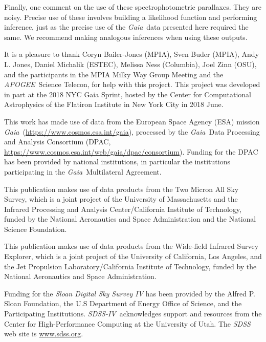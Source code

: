 \documentclass[modern]{aastex62}
\newcommand{\acronym}[1]{{\small{#1}}}
\newcommand{\project}[1]{\textsl{#1}}
\newcommand{\apogee}{\project{\acronym{APOGEE}}}
\newcommand{\gaia}{\project{Gaia}}
\newcommand{\sdssiv}{\project{\acronym{SDSS-IV}}}
\begin{document}
Finally, one comment on the use of these spectrophotometric parallaxes.
They are noisy.
Precise use of these involves building a likelihood function and performing inference,
just as the precise use of the \gaia\ data presented here required the same.
We recommend making analogous inferences when using these outputs.

\acknowledgements
It is a pleasure to thank
  Coryn Bailer-Jones (\acronym{MPIA}),
  Sven Buder (\acronym{MPIA}),
  Andy L. Jones,
  Daniel Michalik (\acronym{ESTEC}),
  Melissa Ness (Columbia),
  Joel Zinn (OSU),
  and the participants in the \acronym{MPIA} Milky Way Group Meeting
  and the \apogee\ Science Telecon,
for help with this project.
This project was developed in part at the
2018 \acronym{NYC} Gaia Sprint, hosted by the Center for Computational Astrophysics of
the Flatiron Institute in New York City in 2018 June.

This work has made use of data from the European Space Agency (\acronym{ESA}) mission
\gaia\ (\url{https://www.cosmos.esa.int/gaia}), processed by the \gaia\ Data
Processing and Analysis Consortium (\acronym{DPAC},
\url{https://www.cosmos.esa.int/web/gaia/dpac/consortium}). Funding for the
\acronym{DPAC}
has been provided by national institutions, in particular the institutions
participating in the \gaia\ Multilateral Agreement.

This publication makes use of data products from the Two Micron All Sky Survey, which is a joint project of the University of Massachusetts and the Infrared Processing and Analysis Center/California Institute of Technology, funded by the National Aeronautics and Space Administration and the National Science Foundation.

This publication makes use of data products from the Wide-field Infrared Survey Explorer, which is a joint project of the University of California, Los Angeles, and the Jet Propulsion Laboratory/California Institute of Technology, funded by the National Aeronautics and Space Administration.

Funding for the \project{Sloan Digital Sky Survey IV} has been provided by the Alfred P. Sloan Foundation, the U.S Department of Energy Office of Science, and the Participating Institutions. \sdssiv\ acknowledges
support and resources from the Center for High-Performance Computing at
the University of Utah. The \project{\acronym{SDSS}} web site is \url{www.sdss.org}.
\end{document}
